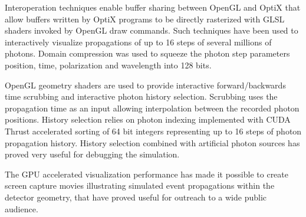 \documentclass[a4paper]{jpconf}
\begin{document}
Interoperation techniques enable buffer sharing between OpenGL and OptiX 
that allow buffers written by OptiX programs to be directly rasterized 
with GLSL shaders invoked by OpenGL draw commands. Such techniques 
have been used to interactively visualize propagations of up to 16 
steps of several millions of photons. Domain compression was used 
to squeeze the photon step parameters position, time, polarization 
and wavelength into 128 bits. 

OpenGL geometry shaders are used to provide interactive forward/backwards time scrubbing
and interactive photon history selection. Scrubbing uses the propagation time as an input 
allowing interpolation between the recorded photon positions.  
History selection relies on photon indexing implemented with CUDA Thrust accelerated 
sorting of 64 bit integers representing up to 16 steps of photon propagation history.   
History selection combined with artificial photon sources has proved 
very useful for debugging the simulation.

The GPU accelerated visualization performance has made it possible to create 
screen capture movies illustrating simulated event propagations 
within the detector geometry, that have proved useful for outreach to a wide public audience. 

\end{document}
